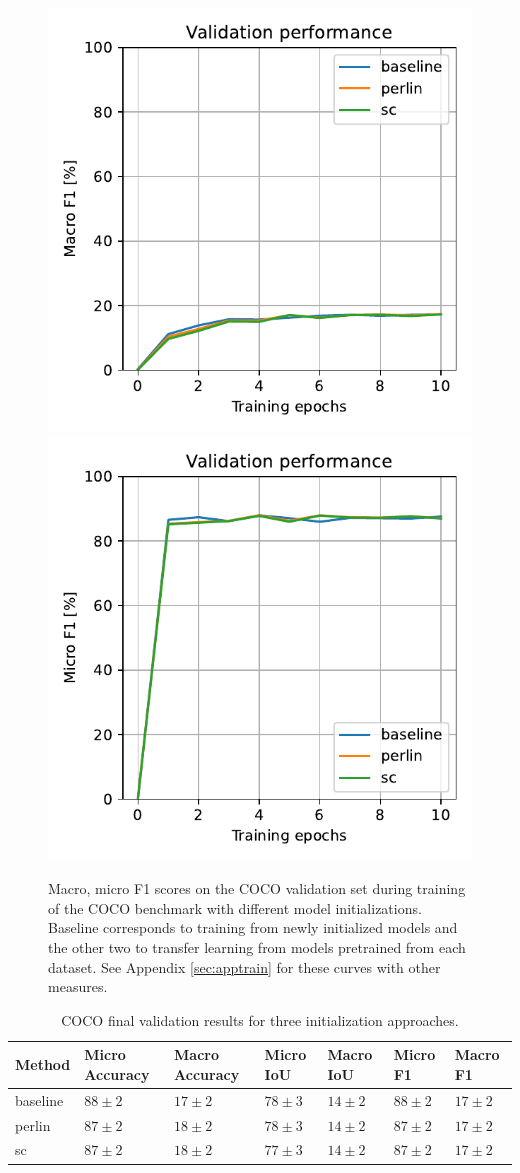 \documentclass[12pt,fleqn]{article}
\begin{document}
\begin{figure}[H]
    \centering
        \includegraphics[width=.49\linewidth]{coco/Macro F1}
        \includegraphics[width=.49\linewidth]{coco/Micro F1}
    \caption{
        Macro, micro F1 scores on the COCO validation set during training of the COCO benchmark with different model initializations. Baseline corresponds to training from newly initialized models and the other two to transfer learning from models pretrained from each dataset. See Appendix \ref{sec:apptrain} for these curves with other measures.
    }
    \label{fig:cococurves}
\end{figure}\noindent


\begin{table}[H]
    \small
    \centering
    \begin{tabular}{l|llllll}
            Method & Micro Accuracy & Macro Accuracy & Micro IoU & Macro IoU & Micro F1 & Macro F1 \\
            \hline
            baseline & $88 \pm 2$ & $17 \pm 2$ & $78 \pm 3$ & $14 \pm 2$ & $88 \pm 2$ & $17 \pm 2$ \\
            perlin & $87 \pm 2$ & $18 \pm 2$ & $78 \pm 3$ & $14 \pm 2$ & $87 \pm 2$ & $17 \pm 2$ \\
            sc & $87 \pm 2$ & $18 \pm 2$ & $77 \pm 3$ & $14 \pm 2$ & $87 \pm 2$ & $17 \pm 2$
    \end{tabular}
    \caption{
        COCO final validation results for three initialization approaches.
    }
    \label{tab:cocofinal}
\end{table}\noindent
\end{document}
